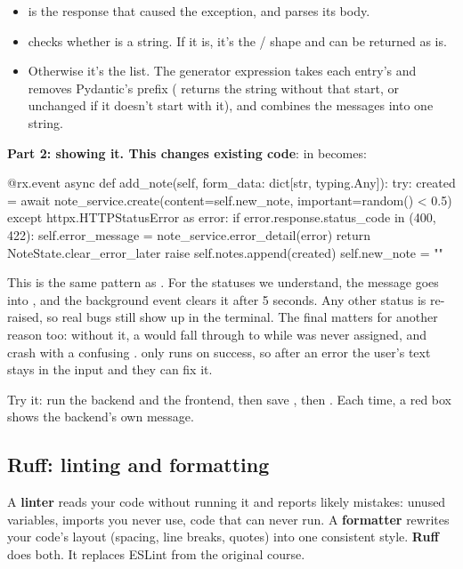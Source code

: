 \begin{itemize}
\item {} is the response that caused the exception, and  parses its body.
\item {} checks whether  is a string. If it is, it's the / shape and can be returned as is.
\item Otherwise it's the  list. The generator expression takes each entry's  and removes Pydantic's prefix ( returns the string without that start, or unchanged if it doesn't start with it), and  combines the messages into one string.
\end{itemize}

\textbf{Part 2: showing it. This changes existing code}:  in  becomes:

\begin{py}
@rx.event
async def add_note(self, form_data: dict[str, typing.Any]):
	try:
		created = await note_service.create(content=self.new_note, important=random() < 0.5)
	except httpx.HTTPStatusError as error:
		if error.response.status_code in (400, 422):
			self.error_message = note_service.error_detail(error)
			return NoteState.clear_error_later
		raise
	self.notes.append(created)
	self.new_note = ""
\end{py}

This is the same pattern as . For the statuses we understand, the message goes into , and the background event clears it after 5 seconds. Any other status is re-raised, so real bugs still show up in the terminal. The final  matters for another reason too: without it, a  would fall through to  while  was never assigned, and crash with a confusing .  only runs on success, so after an error the user's text stays in the input and they can fix it.

Try it: run the backend and the frontend, then save , then . Each time, a red box shows the backend's own message.

\subsection{Ruff: linting and formatting}

A \textbf{linter} reads your code without running it and reports likely mistakes: unused variables, imports you never use, code that can never run. A \textbf{formatter} rewrites your code's layout (spacing, line breaks, quotes) into one consistent style. \textbf{Ruff} does both. It replaces ESLint from the original course.

